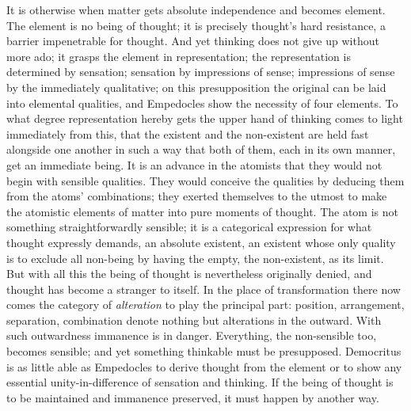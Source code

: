 \documentclass[12pt,a4paper]{book}
\begin{document}
It is otherwise when matter gets absolute independence and becomes element. The element is no being of thought;
it is precisely thought's hard resistance, a barrier impenetrable for thought. And yet thinking does not give up
without more ado; it grasps the element in representation; the representation is determined by sensation;
sensation by impressions of sense; impressions of sense by the immediately qualitative; on this presupposition
the original can be laid into elemental qualities, and Empedocles show the necessity of four elements. To what
degree representation hereby gets the upper hand of thinking comes to light immediately from this, that the
existent and the non-existent are held fast alongside one another in such a way that both of them, each in its
own manner, get an immediate being. It is an advance in the atomists that they would not begin with sensible
qualities. They would conceive the qualities by deducing them from the atoms' combinations; they exerted
themselves to the utmost to make the atomistic elements of matter into pure moments of thought. The atom is not
something straightforwardly sensible; it is a categorical expression for what thought expressly demands, an
absolute existent, an existent whose only quality is to exclude all non-being by having the empty, the
non-existent, as its limit. But with all this the being of thought is nevertheless originally denied, and thought
has become a stranger to itself. In the place of transformation there now comes
the category of \emph{alteration} to play the principal part: position, arrangement, separation, combination
denote nothing but alterations in the outward. With such outwardness immanence is in danger. Everything, the
non-sensible too, becomes sensible; and yet something thinkable must be presupposed. Democritus is as little able
as Empedocles to derive thought from the element or to show any essential unity-in-difference of sensation and
thinking. If the being of thought is to be maintained and immanence preserved, it must happen by another way.
\end{document}
